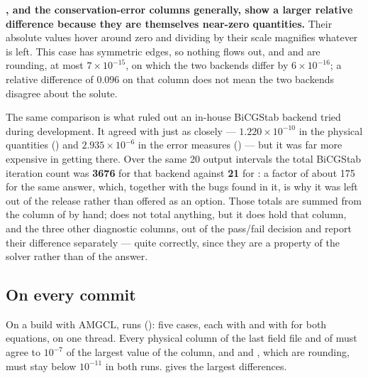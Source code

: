 \textbf{, and the conservation-error columns generally,
show a larger relative difference because they are themselves near-zero
quantities.} Their absolute values hover around zero and dividing by their
scale magnifies whatever is left. This case has symmetric edges, so nothing
flows out, and  and  are rounding, at most
$7\times10^{-15}$, on which the two backends differ by $6\times10^{-16}$; a
relative difference of $0.096$ on that column does not mean the two backends
disagree about the solute.

The same comparison is what ruled out an in-house BiCGStab backend tried
during development. It agreed with  just as closely --- $1.220\times10^{-10}$ in
the physical quantities () and $2.935\times10^{-6}$ in the error
measures () --- but it was far more expensive in getting
there. Over the same 20 output intervals the total BiCGStab iteration count was
\textbf{3676} for that backend against \textbf{21} for : a factor
of about 175 for the same answer, which, together with the bugs found in it, is
why it was left out of the release rather than offered as an option. Those totals are summed
from the  column of  by hand;
 does not total anything, but it does hold that column,
and the three other diagnostic columns, out of the pass/fail decision and
report their difference separately --- quite correctly, since they are a
property of the solver rather than of the answer.

\subsection{On every commit}
\label{sec:verification:backendsci}

On a build with AMGCL,  runs 
(): five cases, each with  and with
 for both equations, on one thread. Every physical column of the
last field file and of  must agree to $10^{-7}$ of the
largest value of the column, and  and , which
are rounding, must stay below $10^{-11}$ in both runs.
 gives the largest differences.

